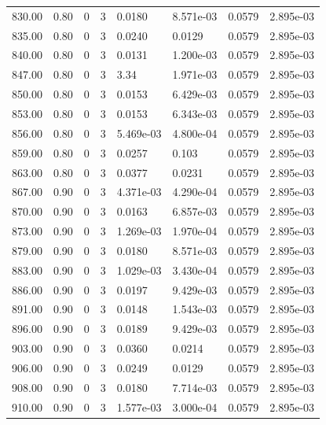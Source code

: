 \documentclass[preview]{standalone}
\begin{document}
{{{{{{{\begin{tabular}{L{1.2cm}C{1.2cm} C{0.3cm}C{0.5cm} C{1.4cm}C{1.4cm} C{1.4cm}C{1.4cm}}
  830.00  &  0.80  & 0     &  3 &  0.0180  & 8.571e-03  & 0.0579 &  2.895e-03   \\ 
  835.00  &  0.80  & 0     &  3 &  0.0240  & 0.0129  & 0.0579 &  2.895e-03   \\ 
  840.00  &  0.80  & 0     &  3 &  0.0131  & 1.200e-03  & 0.0579 &  2.895e-03   \\ 
  847.00  &  0.80  & 0     &  3 &  3.34  & 1.971e-03  & 0.0579 &  2.895e-03   \\ 
  850.00  &  0.80  & 0     &  3 &  0.0153  & 6.429e-03  & 0.0579 &  2.895e-03   \\ 
  853.00  &  0.80  & 0     &  3 &  0.0153  & 6.343e-03  & 0.0579 &  2.895e-03   \\ 
  856.00  &  0.80  & 0     &  3 &  5.469e-03  & 4.800e-04  & 0.0579 &  2.895e-03   \\ 
  859.00  &  0.80  & 0     &  3 &  0.0257  & 0.103  & 0.0579 &  2.895e-03   \\ 
  863.00  &  0.80  & 0     &  3 &  0.0377  & 0.0231  & 0.0579 &  2.895e-03   \\ 
  867.00  &  0.90  & 0     &  3 &  4.371e-03  & 4.290e-04  & 0.0579 &  2.895e-03   \\ 
  870.00  &  0.90  & 0     &  3 &  0.0163  & 6.857e-03  & 0.0579 &  2.895e-03   \\ 
  873.00  &  0.90  & 0     &  3 &  1.269e-03  & 1.970e-04  & 0.0579 &  2.895e-03   \\ 
  879.00  &  0.90  & 0     &  3 &  0.0180  & 8.571e-03  & 0.0579 &  2.895e-03   \\ 
  883.00  &  0.90  & 0     &  3 &  1.029e-03  & 3.430e-04  & 0.0579 &  2.895e-03   \\ 
  886.00  &  0.90  & 0     &  3 &  0.0197  & 9.429e-03  & 0.0579 &  2.895e-03   \\ 
  891.00  &  0.90  & 0     &  3 &  0.0148  & 1.543e-03  & 0.0579 &  2.895e-03   \\ 
  896.00  &  0.90  & 0     &  3 &  0.0189  & 9.429e-03  & 0.0579 &  2.895e-03   \\ 
  903.00  &  0.90  & 0     &  3 &  0.0360  & 0.0214  & 0.0579 &  2.895e-03   \\ 
  906.00  &  0.90  & 0     &  3 &  0.0249  & 0.0129  & 0.0579 &  2.895e-03   \\ 
  908.00  &  0.90  & 0     &  3 &  0.0180  & 7.714e-03  & 0.0579 &  2.895e-03   \\ 
  910.00  &  0.90  & 0     &  3 &  1.577e-03  & 3.000e-04  & 0.0579 &  2.895e-03   \\ 

\end{tabular}}}}}}}}
\end{document}
